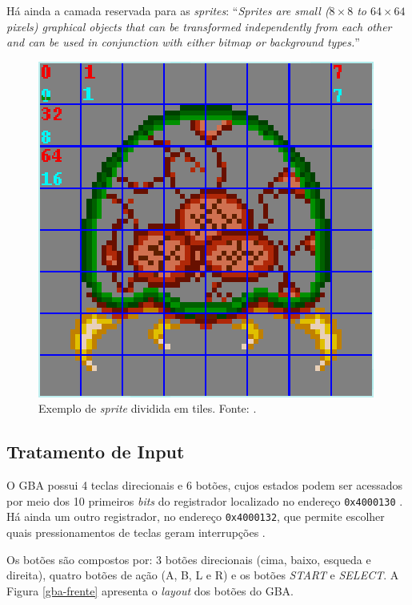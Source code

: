     Há ainda a camada reservada para as \textit{sprites}: ``\textit{Sprites are small ($8\times8$ to $64\times64$ pixels) graphical objects that can be transformed independently from each other and can be used in conjunction with either bitmap or background types.}'' \cite[p. 38]{tonc}

    \begin{figure}[H]
    \centering \includegraphics[keepaspectratio=true,scale=0.6]{figuras/metroid-sprite.eps}
      \caption[Exemplo de \textit{sprite} dividida em tiles]
        {Exemplo de \textit{sprite} dividida em tiles. Fonte: \cite{tonc}.}
      \label{metroid-sprite}
    \end{figure}

  \subsection{Tratamento de Input}

    O GBA possui 4 teclas direcionais e 6 botões, cujos estados podem ser acessados por meio dos 10 primeiros \textit{bits} do registrador localizado no endereço \texttt{0x4000130} \cite{gbatek}. Há ainda um outro registrador, no endereço \texttt{0x4000132}, que permite escolher quais pressionamentos de teclas geram interrupções \cite{cowbite}.

    Os botões são compostos por: 3 botões direcionais (cima, baixo, esqueda e direita), quatro botões de ação (A, B, L e R) e os botões \textit{START} e \textit{SELECT}. A Figura \ref  {gba-frente} apresenta o \textit{layout} dos botões do GBA.

